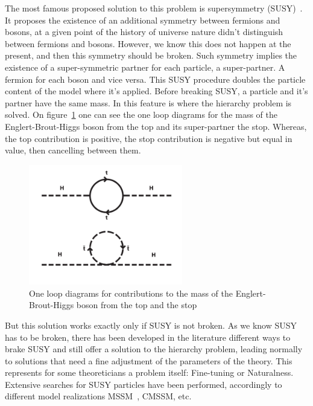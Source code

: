 The most famous proposed solution to this problem is supersymmetry (SUSY)~\cite{Martin:1997ns}. It proposes the existence of an additional symmetry between fermions and bosons, at a given point of the history of universe nature didn't distinguish between fermions and bosons. However, we know this does not happen at the present, and then this symmetry should be broken. Such symmetry implies the existence of a super-symmetric partner for each particle, a super-partner. A fermion for each boson and vice versa. This SUSY procedure doubles the particle content of the model where it's applied. Before breaking SUSY, a particle and it's partner have the same mass. In this feature is where the hierarchy problem is solved. On figure~\ref{fig:susy} one can see the one loop diagrams for the mass of the Englert-Brout-Higgs boson from the top and its super-partner the stop. Whereas, the top contribution is positive, the stop contribution is negative but equal in value, then cancelling between them.

\begin{figure}[!Hhtbp]
  \begin{center}
    \includegraphics[width=0.6\textwidth]{figs/SUSY.png}
    \caption{One loop diagrams for contributions to the mass of the Englert-Brout-Higgs boson from the top and the stop}
    \label{fig:susy}
  \end{center}
\end{figure}

But this solution works exactly only if SUSY is not broken. As we know SUSY has to be broken, there has been developed in the literature different ways to brake SUSY and still offer a solution to the hierarchy problem, leading normally to solutions that need a fine adjustment of the parameters of the theory. This represents for some theoreticians a problem itself: Fine-tuning or Naturalness. Extensive searches for SUSY particles have been performed, accordingly to different model realizations MSSM~\cite{Khachatryan:2014wca,Aad:2014vgg}, CMSSM, etc.

